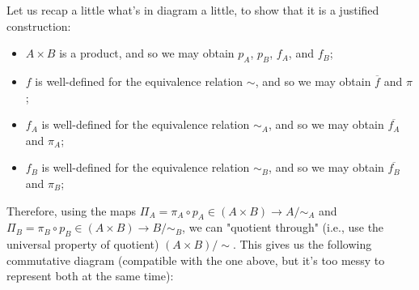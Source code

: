 
Let us recap a little what's in diagram a little, to show that it is a justified construction:
\begin{itemize}
	\item $A \times B$ is a product, and so we may obtain $p_A$, $p_B$, $f_A$, and $f_B$;
    \item $f$ is well-defined for the equivalence relation $\sim$, and so we may obtain $\overline{f}$ and $\pi$;
    \item $f_A$ is well-defined for the equivalence relation $\sim_A$, and so we may obtain $\overline{f_A}$ and $\pi_A$;
    \item $f_B$ is well-defined for the equivalence relation $\sim_B$, and so we may obtain $\overline{f_B}$ and $\pi_B$;
\end{itemize}

Therefore, using the maps $\Pi_A = \pi_A \circ p_A \in (A \times B) \to A/\sim_A$ and $\Pi_B = \pi_B \circ p_B \in (A \times B) \to B/\sim_B$, we can "quotient through" (i.e., use the universal property of quotient) $(A \times B)/\sim$. This gives us the following commutative diagram (compatible with the one above, but it's too messy to represent both at the same time):

